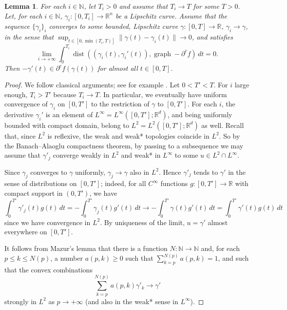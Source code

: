 \documentclass[11pt]{article}
\newtheorem{lem}[thm]{Lemma}
\theoremstyle{definition}
\theoremstyle{remark}
\DeclareMathOperator{\dist}{dist}
\newcommand{\R}{\mathbb{R}}
\newcommand{\N}{\mathbb{N}}
\renewcommand{\geq}{\geqslant}
\renewcommand{\leq}{\leqslant}
\begin{document}
\begin{lem}\label{lem:derivativeclarke}
 For each $i\in \N$, let $T_i>0$ and assume that $T_i\to T$ for some $T>0$. Let, for each $i\in\N$, $\gamma_i\colon [0,T_i]\to\R^n$ be a Lipschitz curve. Assume that the sequence $\{\gamma_i\}_i$ converges to some bounded, Lipschitz curve $\gamma\colon[0,T]\to \R$, $\gamma_i\to\gamma$, in the sense that $\sup_{t\in[0,\min(T_i,T)]}\|\gamma(t)-\gamma_i(t)\|\to 0$, and satisfies
 \begin{equation}\label{eq:closetoclarke}\lim_{i\to+\infty}\int_0^{T_i}\dist((\gamma_i(t),\gamma_i'(t)),\operatorname{graph}-\partial^cf)\,dt=0.
 \end{equation}
 Then $-\gamma'(t)\in\partial^cf(\gamma(t))$ for almost all $t\in[0,T]$.
\end{lem}
\begin{proof}
 We follow classical arguments; see for example \cite[Theorem 4.2]{BHS}. Let $0<T'<T$. For $i$ large enough, $T_i>T'$ because $T_i\to T$. In particular, we eventually have uniform convergence of $\gamma_i$ on $[0,T']$ to the restriction of $\gamma$ to $[0,T']$. 
 For each $i$, the derivative $\gamma_i'$ is an element of $L^\infty=L^\infty([0,T'];\R^d)$, and being uniformly bounded with compact domain, belong to $L^2=L^2([0,T'];\R^d)$ as well.
 Recall that, since $L^2$ is reflexive, the weak and weak* topologies coincide in $L^2$.
 So by the Banach--Alaoglu compactness theorem, by passing to a subsequence we may assume that $\gamma'_j$ converge weakly in $L^2$ and weak* in $L^\infty$ to some $u\in L^2 \cap L^\infty$.
 
 Since $\gamma_j$ converges to $\gamma$ uniformly, $\gamma_j\to\gamma$ also in $L^2$. Hence $\gamma'_j$ tends to $\gamma'$ in the sense of distributions on $[0,T']$; indeed, for all $C^\infty$ functions $g\colon[0,T']\to\R$ with compact support in $(0,T')$, we have 
 \begin{equation*}
  \int_0^{T'}\gamma'_j(t)g(t)\,dt=-\int_0^{T'}\gamma_j(t)g'(t)\,dt
  \to-\int_0^{T'}\gamma(t)g'(t)\,dt
  =\int_0^{T'}\gamma'(t)g(t)\,dt
 \end{equation*}
 since we have convergence in $L^2$. By uniqueness of the limit, $u=\gamma'$ almost everywhere on $[0,T']$.
 
%
%
%
 
 
%
It follows from Mazur's lemma \cite[p. 6]{ekelandtemam} that there is a function $N\colon\N\to\N$ and, for each $p\leq k\leq N(p)$, a number $a(p,k)\geq 0$ such that $\sum_{k=p}^{N(p)}a(p,k)=1$, and such that the convex combinations \begin{equation}\label{eq:mazur}
 \sum_{k=p}^{N(p)}a(p,k)\gamma'_k\to\gamma'
\end{equation}
 strongly in $L^2$ as $p\to +\infty$ (and also in the weak* sense in $L^\infty$). 
%
  



\end{proof}
\end{document}
